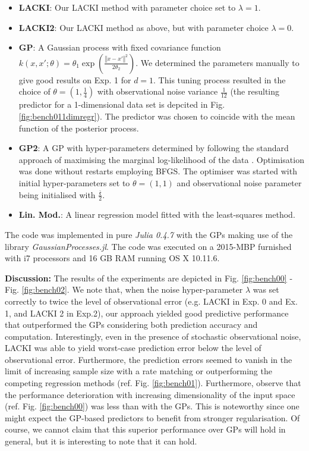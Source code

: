 \documentclass{article} %
\theoremstyle{definition}
\theoremstyle{remark}
\newcommand{\norm}[1]{\left\Vert#1\right\Vert}
\newcommand{\hestthresh}{\ensuremath{ \lambda}}
\newcommand{\obserrbnd}{\bar{\mathfrak e}}
\begin{document}
\begin{itemize}
\item \textbf{LACKI}: Our LACKI method with parameter choice set to $\hestthresh =1$. 
\item \textbf{LACKI2}: Our LACKI method as above, but with parameter choice $\hestthresh =0$. 
\item \textbf{GP}: A Gaussian process  \cite{GPbook:2006} with fixed covariance function $k(x,x';\theta) = \theta_1 \exp( \frac{\norm{x-x'}^2}{2 \theta_2})$. We determined the parameters manually to give good results on Exp. 1 for $d=1$. This tuning process resulted in the choice of $\theta = (1,\frac 1 4)$ with observational noise variance $\frac 1 {12}$ (the resulting predictor for a 1-dimensional data set is depcited in Fig. \ref{fig:bench011dimregr}). The predictor was chosen to coincide with the mean function of the posterior process.
\item \textbf{GP2}: A GP with hyper-parameters determined by following the standard approach of maximising the marginal log-likelihood of the data \cite{GPbook:2006}. Optimisation was done without restarts employing BFGS. The optimiser was started with initial hyper-parameters set to $\theta = (1,1)$ and observational noise parameter being initialised with $\frac{\obserrbnd}{2}$.
\item \textbf{Lin. Mod.}: A linear regression model fitted with the least-squares method.
\end{itemize}

The code was implemented in pure \emph{Julia 0.4.7} with the GPs making use of the library \emph{GaussianProcesses.jl}. The code was executed on a 2015-MBP furnished with i7 processors and 16 GB RAM running OS X 10.11.6. 



\textbf{Discussion:}
The results of the experiments are depicted in Fig. \ref {fig:bench00} - Fig. \ref{fig:bench02}.
We note that, when the noise hyper-parameter $\hestthresh$ was set correctly to twice the level of observational error (e.g. LACKI in Exp. 0 and Ex. 1, and LACKI 2 in Exp.2), our approach yielded good predictive performance that outperformed the GPs considering both prediction accuracy and computation. Interestingly, even in the presence of stochastic observational noise, LACKI was able to yield  worst-case prediction error below the level of observational error. Furthermore, the prediction errors seemed to vanish in the limit of increasing sample size with a rate matching or outperforming the competing regression methods (ref. Fig. \ref{fig:bench01}). Furthermore, observe that the performance deterioration with increasing dimensionality of the input space (ref. Fig. \ref{fig:bench00}) was less than with the GPs. This is noteworthy since one might expect the GP-based predictors to benefit from stronger regularisation. Of course, we cannot claim that this superior performance over GPs will hold in general, but it is interesting to note that it can hold.
\end{document}
